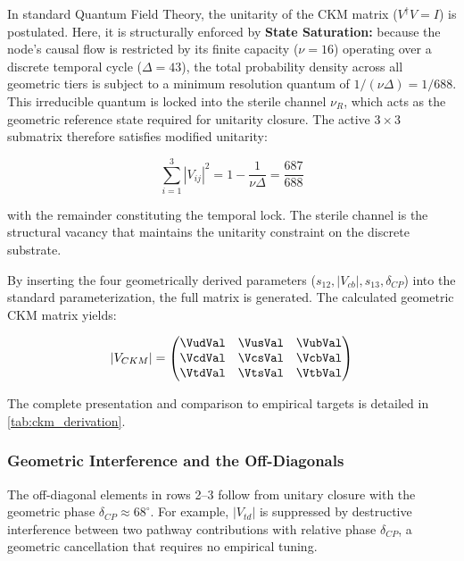 In standard Quantum Field Theory, the unitarity of the CKM matrix ($V^\dagger V = I$) is postulated. Here, it is structurally enforced by \textbf{State Saturation:} because the node's causal flow is restricted by its finite capacity ($\nu = 16$) operating over a discrete temporal cycle ($\Delta = 43$), the total probability density across all geometric tiers is subject to a minimum resolution quantum of $1/(\nu\Delta) = 1/688$. This irreducible quantum is locked into the sterile channel $\nu_R$, which acts as the geometric reference state required for unitarity closure. The active $3\times3$ submatrix therefore satisfies modified unitarity:

\begin{equation}
\sum_{i=1}^{3} |V_{ij}|^2 = 1 - \frac{1}{\nu\Delta} = \frac{687}{688}
\end{equation}

with the remainder constituting the temporal lock. The sterile channel is the structural vacancy that maintains the unitarity constraint on the discrete substrate.

By inserting the four geometrically derived parameters ($s_{12}, |V_{cb}|, s_{13}, \delta_{CP}$) into the standard parameterization, the full matrix is generated. The calculated geometric CKM matrix yields:

\begin{equation}
|V_{CKM}| =
\begin{pmatrix}
\VudVal & \VusVal & \VubVal \\
\VcdVal & \VcsVal & \VcbVal \\
\VtdVal & \VtsVal & \VtbVal
\end{pmatrix}
\end{equation}

The complete presentation and comparison to empirical targets is detailed in \cref{tab:ckm_derivation}.



\subsubsection{Geometric Interference and the Off-Diagonals}
The off-diagonal elements in rows 2--3 follow from unitary closure with the geometric phase $\delta_{CP} \approx 68^\circ$. For example, $|V_{td}|$ is suppressed by destructive interference between two pathway contributions with relative phase $\delta_{CP}$, a geometric cancellation that requires no empirical tuning.

